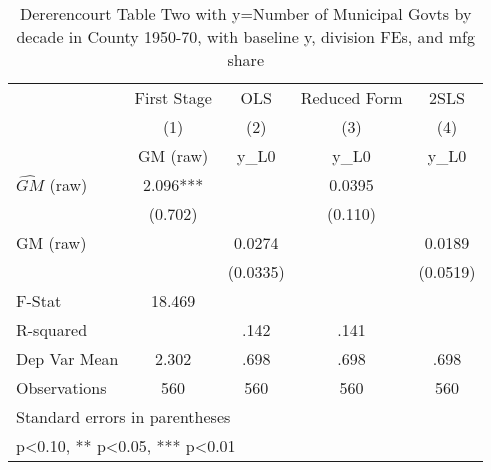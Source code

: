 \begin{table}[htbp]\centering
\def\sym#1{\ifmmode^{#1}\else\(^{#1}\)\fi}
\caption{Dererencourt Table Two with y=Number of Municipal Govts by decade in County 1950-70, with baseline y, division FEs, and mfg share}
\begin{tabular}{l*{4}{c}}
\toprule
                    & First Stage   &         OLS   &Reduced Form   &        2SLS   \\
                    &\multicolumn{1}{c}{(1)}&\multicolumn{1}{c}{(2)}&\multicolumn{1}{c}{(3)}&\multicolumn{1}{c}{(4)}\\
                    &\multicolumn{1}{c}{GM  (raw)}&\multicolumn{1}{c}{y\_L0}&\multicolumn{1}{c}{y\_L0}&\multicolumn{1}{c}{y\_L0}\\
\midrule
$\hat{GM}$ (raw)    &       2.096***&               &      0.0395   &               \\
                    &     (0.702)   &               &     (0.110)   &               \\
\addlinespace
GM  (raw)           &               &      0.0274   &               &      0.0189   \\
                    &               &    (0.0335)   &               &    (0.0519)   \\
\midrule
F-Stat              &      18.469   &               &               &               \\
R-squared           &               &        .142   &        .141   &               \\
Dep Var Mean        &       2.302   &        .698   &        .698   &        .698   \\
Observations        &         560   &         560   &         560   &         560   \\
\bottomrule
\multicolumn{5}{l}{\footnotesize Standard errors in parentheses}\\
\multicolumn{5}{l}{\footnotesize * p<0.10, ** p<0.05, *** p<0.01}\\
\end{tabular}
\end{table}
